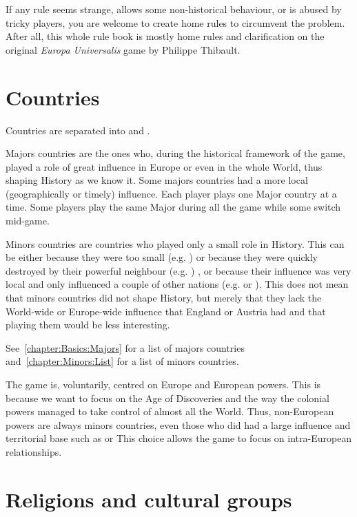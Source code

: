 \aparag If any rule seems strange, allows some non-historical behaviour, or is
abused by tricky players, you are welcome to create home rules to circumvent
the problem. After all, this whole rule book is mostly home rules and
clarification on the original \emph{Europa Universalis} game by Philippe
Thibault.


\section{Countries}

 Countries are separated into  and .

\aparag Majors countries are the ones who, during the historical framework of
the game, played a role of great influence in Europe or even in the whole
World, thus shaping History as we know it.
\bparag Some majors countries had a more local (geographically or timely)
influence.
\bparag Each player plays one Major country at a time. Some players play the
same Major during all the game while some switch mid-game.

\aparag Minors countries are countries who played only a small role in
History.
\bparag This can be either because they were too small (e.g. \paysCologne) or
because they were quickly destroyed by their powerful neighbour
(e.g. \paysDamas) , or because their influence was very local and only
influenced a couple of other nations (e.g. \paysPerse or \paysEcosse).
\bparag This does not mean that minors countries did not shape History, but
merely that they lack the World-wide or Europe-wide influence that England or
Austria had and that playing them would be less interesting.

\aparag See~\ref{chapter:Basics:Majors} for a list of majors countries
and~\ref{chapter:Minors:List} for a list of minors countries.

 The game is, voluntarily, centred on Europe and
European powers. This is because we want to focus on the Age of Discoveries
and the way the colonial powers managed to take control of almost all the
World.
\bparag Thus, non-European powers are always minors countries, even those who
did had a large influence and territorial base such as \paysChine or
\paysMogol %
\bparag This choice allows the game to focus on intra-European relationships.




\section{Religions and cultural groups}

